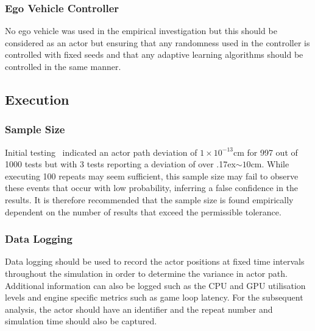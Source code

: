 \documentclass[letterpaper, 10 pt, journal, twoside]{IEEEtran}
\begin{document}
\subsubsection{Ego Vehicle Controller}
No ego vehicle was used in the empirical investigation but this should be considered as an actor but ensuring that any randomness used in the controller is controlled with fixed seeds and that any adaptive learning algorithms should be controlled in the same manner.

\subsection{Execution}


\subsubsection{Sample Size}
Initial testing~\cite{TSLUnrealEngineTesting} indicated an actor path deviation of $1\times10^{-13}$cm for 997 out of 1000 tests but with 3 tests reporting a deviation of over {\raise.17ex\hbox{$\scriptstyle\sim$}}$10$cm. While executing 100 repeats may seem sufficient, this sample size may fail to observe these events that occur with low probability, inferring a false confidence in the results. It is therefore recommended that the sample size is found empirically dependent on the number of results that exceed the permissible tolerance. 

\subsubsection{Data Logging}
Data logging should be used to record the actor positions at fixed time intervals throughout the simulation in order to determine the variance in actor path. Additional information can also be logged such as the CPU and GPU utilisation levels and engine specific metrics such as game loop latency.
For the subsequent analysis, the actor should have an identifier and the repeat number and simulation time should also be captured. 
\end{document}
